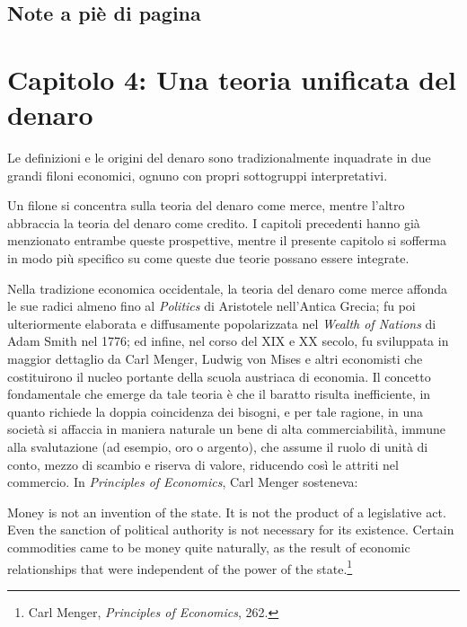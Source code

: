 \documentclass[
  a5paper,
  smalldemyvopaper,10pt,twoside,onecolumn,openright,extrafontsizes,hidelinks]{memoir}
\renewenvironment{quote}%
               {\list{}{\rightmargin=.6cm\leftmargin=.6cm}%
                \itshape \item[]}%
               {\endlist}
\begin{document}
\section{Note a piè di pagina}\label{note-a-piuxe8-di-pagina-3}


\chapter{\texorpdfstring{Capitolo 4: \textbf{Una teoria unificata del
denaro}}{Capitolo 4: Una teoria unificata del denaro}}\label{capitolo-4-una-teoria-unificata-del-denaro-1}

Le definizioni e le origini del denaro sono tradizionalmente inquadrate
in due grandi filoni economici, ognuno con propri sottogruppi
interpretativi.

Un filone si concentra sulla teoria del denaro come merce, mentre
l'altro abbraccia la teoria del denaro come credito. I capitoli
precedenti hanno già menzionato entrambe queste prospettive, mentre il
presente capitolo si sofferma in modo più specifico su come queste due
teorie possano essere integrate.

Nella tradizione economica occidentale, la teoria del denaro come merce
affonda le sue radici almeno fino al \emph{Politics} di Aristotele
nell'Antica Grecia; fu poi ulteriormente elaborata e diffusamente
popolarizzata nel \emph{Wealth of Nations} di Adam Smith nel 1776; ed
infine, nel corso del XIX e XX secolo, fu sviluppata in maggior
dettaglio da Carl Menger, Ludwig von Mises e altri economisti che
costituirono il nucleo portante della scuola austriaca di economia. Il
concetto fondamentale che emerge da tale teoria è che il baratto risulta
inefficiente, in quanto richiede la doppia coincidenza dei bisogni, e
per tale ragione, in una società si affaccia in maniera naturale un bene
di alta commerciabilità, immune alla svalutazione (ad esempio, oro o
argento), che assume il ruolo di unità di conto, mezzo di scambio e
riserva di valore, riducendo così le attriti nel commercio. In
\emph{Principles of Economics}, Carl Menger sosteneva:

\begin{quote}
Money is not an invention of the state. It is not the product of a
legislative act. Even the sanction of political authority is not
necessary for its existence. Certain commodities came to be money quite
naturally, as the result of economic relationships that were independent
of the power of the state.\footnote{Carl Menger, \emph{Principles of
  Economics}, 262.}
\end{quote}
\end{document}
